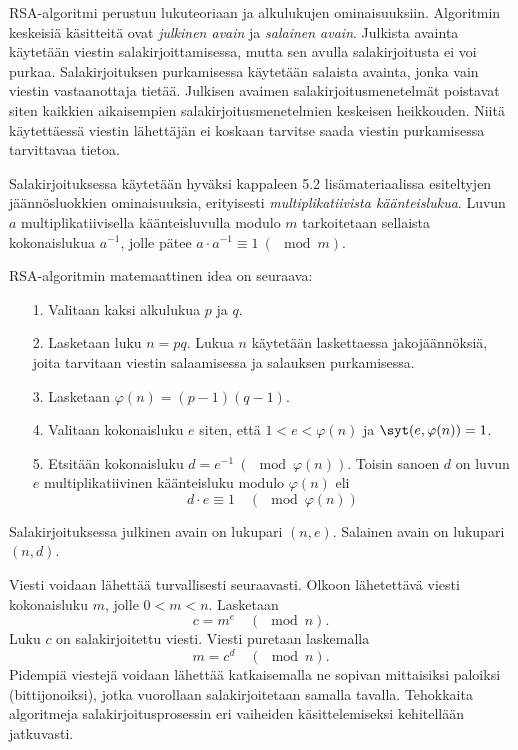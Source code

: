 RSA-algoritmi perustuu lukuteoriaan ja alkulukujen ominaisuuksiin. Algoritmin keskeisiä käsitteitä ovat {\em julkinen avain} ja {\em salainen avain}. Julkista avainta käytetään viestin salakirjoittamisessa, mutta sen avulla salakirjoitusta ei voi purkaa. Salakirjoituksen purkamisessa käytetään salaista avainta, jonka vain viestin vastaanottaja tietää. Julkisen avaimen salakirjoitusmenetelmät poistavat siten kaikkien aikaisempien salakirjoitusmenetelmien keskeisen heikkouden. Niitä käytettäessä viestin lähettäjän ei koskaan tarvitse saada viestin purkamisessa tarvittavaa tietoa. 

Salakirjoituksessa käytetään hyväksi kappaleen 5.2 lisämateriaalissa esiteltyjen jään\-nös\-luok\-kien ominaisuuksia, erityisesti {\em multiplikatiivista käänteislukua}. Luvun $a$ multiplikatiivisella käänteisluvulla modulo $m$ tarkoitetaan sellaista kokonaislukua $a^{-1}$, jolle pätee $a\cdot a^{-1} \equiv 1 \ (\mod m)$.

RSA-algoritmin matemaattinen idea on seuraava:
\begin{itemize}
\item[1.] Valitaan kaksi alkulukua $p$ ja $q$.
\item[2.] Lasketaan luku $n=pq$. Lukua $n$ käytetään laskettaessa jakojäännöksiä, joita tarvitaan viestin salaamisessa ja salauksen purkamisessa.
\item[3.] Lasketaan $\varphi(n)=(p-1)(q-1)$. 
\item[4.] Valitaan kokonaisluku $e$ siten, että $1<e<\varphi(n)$ ja $\syt(e,\varphi(n))=1$.
\item[5.] Etsitään kokonaisluku $d = e^{-1}\ (\mod \varphi(n))$. Toisin sanoen $d$ on luvun $e$  multiplikatiivinen käänteisluku modulo $\varphi(n)$ eli
\[
d\cdot e \equiv 1\quad (\mod\varphi(n)) %
\]
\end{itemize}
Salakirjoituksessa julkinen avain on lukupari $(n,e)$. Salainen avain on lukupari $(n,d)$. 

Viesti voidaan lähettää turvallisesti seuraavasti. Olkoon lähetettävä viesti kokonaisluku $m$, jolle $0<m<n$. Lasketaan
\[
c= m^e\quad (\mod n).
\]
Luku $c$ on salakirjoitettu viesti. Viesti puretaan laskemalla
\[
m=c^d\quad (\mod n).
\]
Pidempiä viestejä voidaan lähettää katkaisemalla ne sopivan mittaisiksi paloiksi (bittijonoiksi), jotka vuorollaan salakirjoitetaan samalla tavalla. Tehokkaita algoritmeja salakirjoitusprosessin eri vaiheiden käsittelemiseksi kehitellään jatkuvasti.

